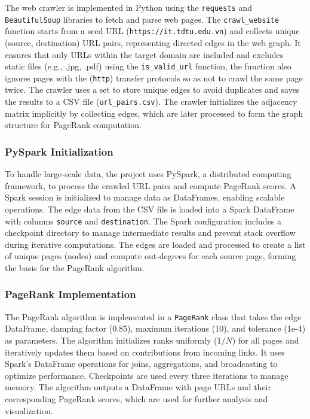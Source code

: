 The web crawler is implemented in Python using the \texttt{requests} and \texttt{BeautifulSoup} libraries to fetch and parse web pages.
The \texttt{crawl\_website} function starts from a seed URL (\texttt{https://it.tdtu.edu.vn}) and collects unique (source, destination) URL pairs, representing directed edges in the web graph.
It ensures that only URLs within the target domain are included and excludes static files (e.g., .jpg, .pdf) using the \texttt{is\_valid\_url} function, the function also ignores pages with the (\texttt{http}) transfer protocols so as not to crawl the same page twice.
The crawler uses a set to store unique edges to avoid duplicates and saves the results to a CSV file (\texttt{url\_pairs.csv}). The crawler initializes the adjacency matrix implicitly by collecting edges, which are later processed to form the graph structure for PageRank computation.

\subsubsection{PySpark Initialization}\text{}

To handle large-scale data, the project uses PySpark, a distributed computing framework, to process the crawled URL pairs and compute PageRank scores.
A Spark session is initialized to manage data as DataFrames, enabling scalable operations.
The edge data from the CSV file is loaded into a Spark DataFrame with columns \texttt{source} and \texttt{destination}.
The Spark configuration includes a checkpoint directory to manage intermediate results and prevent stack overflow during iterative computations.
The edges are loaded and processed to create a list of unique pages (nodes) and compute out-degrees for each source page, forming the basis for the PageRank algorithm.

\subsubsection{PageRank Implementation}\text{}

The PageRank algorithm is implemented in a \texttt{PageRank} class that takes the edge DataFrame, damping factor (0.85), maximum iterations (10), and tolerance (1e-4) as parameters.
The algorithm initializes ranks uniformly ($1/N$) for all pages and iteratively updates them based on contributions from incoming links.
It uses Spark's DataFrame operations for joins, aggregations, and broadcasting to optimize performance.
Checkpoints are used every three iterations to manage memory.
The algorithm outputs a DataFrame with page URLs and their corresponding PageRank scores, which are used for further analysis and visualization.

